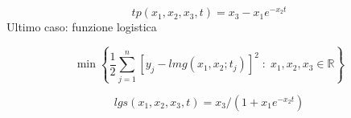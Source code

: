 $$ tp(x_1,x_2, x_3, t) =x_3 - x_1 e^{-x_2 t}$$
Ultimo caso: funzione logistica

$$
 \min \left\{ \frac{1}{2} 
\displaystyle \sum_{j=1}^{n}[y_j - lmg(x_1,x_2;t_j)]^{2}\; : \;
x_1, x_2, x_3 \in \mathbb{R} \right\}
$$

$$lgs(x_1,x_2, x_3, t) =x_3 /(1+x_1e^{-x_2t})$$

\outbpdocument

